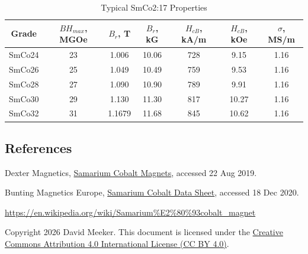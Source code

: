 \documentclass{article}
\begin{document}
\begin{table}[htbp]
\centering
\begin{tabular}{|c|c|c|c|c|c|c|}
\hline
Grade & \(BH_{max}\), MGOe & \(B_r\), T & \(B_r\), kG & \(H_{cB}\), kA/m & \(H_{cB}\), kOe & \(\sigma\), MS/m \\ \hline \hline
SmCo24 & 23 & 1.006 & 10.06 & 728 & 9.15 & 1.16 \\ \hline
SmCo26 & 25 & 1.049 & 10.49 & 759 & 9.53 & 1.16 \\ \hline
SmCo28 & 27 & 1.090 & 10.90 & 789 & 9.91 & 1.16 \\ \hline
SmCo30 & 29 & 1.130 & 11.30 & 817 & 10.27 & 1.16 \\ \hline
SmCo32 & 31 & 1.1679 & 11.68 & 845 & 10.62 & 1.16 \\ \hline
\end{tabular}
\caption{Typical SmCo2:17 Properties}
\end{table}

\subsection*{References}

\noindent Dexter Magnetics, \href{https://web.archive.org/web/20201124041321/https://www.dextermag.com/products/permanent-magnets/samarium-cobalt-magnets/}{Samarium Cobalt Magnets}, accessed 22 Aug 2019.

\noindent Bunting Magnetics Europe, \href{https://web.archive.org/web/20201218013444/https://www.buntingeurope.com/wp-content/uploads/2018/07/BME_Samarium_Cobalt_data_sheet.pdf}{Samarium Cobalt Data Sheet}, accessed 18 Dec 2020.

\noindent \url{https://en.wikipedia.org/wiki/Samarium%E2%80%93cobalt_magnet}

\noindent Copyright 2026 David Meeker. This document is licensed under the \href{https://creativecommons.org/licenses/by/4.0/}{Creative Commons Attribution 4.0 International License (CC BY 4.0)}.
\end{document}
